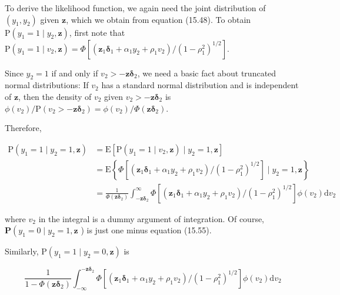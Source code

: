 \documentclass[10pt]{article}
\begin{document}
To derive the likelihood function, we again need the joint distribution of $\left(y_{1}, y_{2}\right)$ given $\mathbf{z}$, which we obtain from equation (15.48). To obtain $\mathrm{P}\left(y_{1}=1 \mid y_{2}, \mathbf{z}\right)$, first note that\\
$\mathrm{P}\left(y_{1}=1 \mid v_{2}, \mathbf{z}\right)=\Phi\left[\left(\mathbf{z}_{1} \boldsymbol{\delta}_{1}+\alpha_{1} y_{2}+\rho_{1} v_{2}\right) /\left(1-\rho_{1}^{2}\right)^{1 / 2}\right]$.

Since $y_{2}=1$ if and only if $v_{2}>-\mathbf{z} \boldsymbol{\delta}_{2}$, we need a basic fact about truncated normal distributions: If $v_{2}$ has a standard normal distribution and is independent of $\mathbf{z}$, then the density of $v_{2}$ given $v_{2}>-\mathbf{z} \boldsymbol{\delta}_{2}$ is\\
$\phi\left(v_{2}\right) / \mathrm{P}\left(v_{2}>-\mathbf{z} \boldsymbol{\delta}_{2}\right)=\phi\left(v_{2}\right) / \Phi\left(\mathbf{z} \boldsymbol{\delta}_{2}\right)$.

Therefore,


\begin{align*}
\mathrm{P}\left(y_{1}=1 \mid y_{2}=1, \mathbf{z}\right) & =\mathrm{E}\left[\mathrm{P}\left(y_{1}=1 \mid v_{2}, \mathbf{z}\right) \mid y_{2}=1, \mathbf{z}\right] \\
& =\mathrm{E}\left\{\Phi\left[\left(\mathbf{z}_{1} \boldsymbol{\delta}_{1}+\alpha_{1} y_{2}+\rho_{1} v_{2}\right) /\left(1-\rho_{1}^{2}\right)^{1 / 2}\right] \mid y_{2}=1, \mathbf{z}\right\} \\
& =\frac{1}{\Phi\left(\mathbf{z} \boldsymbol{\delta}_{2}\right)} \int_{-\mathbf{z} \boldsymbol{\delta}_{2}}^{\infty} \Phi\left[\left(\mathbf{z}_{1} \boldsymbol{\delta}_{1}+\alpha_{1} y_{2}+\rho_{1} v_{2}\right) /\left(1-\rho_{1}^{2}\right)^{1 / 2}\right] \phi\left(v_{2}\right) \mathrm{d} v_{2} \tag{15.55}
\end{align*}


where $v_{2}$ in the integral is a dummy argument of integration. Of course, $\mathbf{P}\left(y_{1}=\right. 0 \mid y_{2}=1, \mathbf{z}$ ) is just one minus equation (15.55).

Similarly, $\mathrm{P}\left(y_{1}=1 \mid y_{2}=0, \mathbf{z}\right)$ is


\begin{equation*}
\frac{1}{1-\Phi\left(\mathbf{z} \boldsymbol{\delta}_{2}\right)} \int_{-\infty}^{-\mathbf{z} \boldsymbol{\delta}_{2}} \Phi\left[\left(\mathbf{z}_{1} \boldsymbol{\delta}_{1}+\alpha_{1} y_{2}+\rho_{1} v_{2}\right) /\left(1-\rho_{1}^{2}\right)^{1 / 2}\right] \phi\left(v_{2}\right) \mathrm{d} v_{2} \tag{15.56}
\end{equation*}
\end{document}
